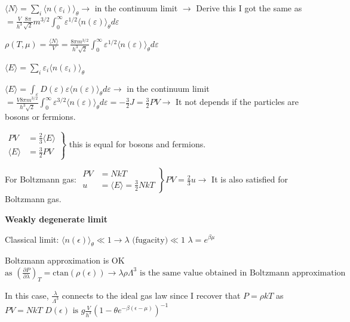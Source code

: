 \documentclass[12pt,a4paper]{report}
\newcommand{\esp}{\vspace{0.5cm}}
\begin{document}
	\esp
	$\langle N \rangle = \sum_i \langle n(\varepsilon_i) \rangle_{\theta} \rightarrow$ in the continuum limit $\rightarrow$ Derive this I got the same as $= \frac{V}{h^3} \frac{8\pi}{\sqrt{2}} m^{3/2} \int_{0}^{\infty} \varepsilon^{1/2} \langle n(\varepsilon) \rangle_{\theta} d\varepsilon$
	
	\esp
	$\rho(T, \mu) = \frac{\langle N \rangle}{V} = \frac{8\pi m^{3/2}}{h^3 \sqrt{2}} \int_{0}^{\infty} \varepsilon^{1/2} \langle n(\varepsilon) \rangle_{\theta} d\varepsilon$
	
	\esp
	$\langle E \rangle = \sum_i \varepsilon_i \langle n(\varepsilon_i) \rangle_{\theta}$
	
	\esp
	$\langle E \rangle = \int_{\varepsilon} D(\varepsilon) \varepsilon \langle n(\varepsilon) \rangle_{\theta} d\varepsilon \rightarrow$ in the continuum limit $= \frac{V 8\pi m^{3/2}}{h^3 \sqrt{2}} \int_{0}^{\infty} \varepsilon^{3/2} \langle n(\varepsilon) \rangle_{\theta} d\varepsilon = -\frac{3}{2} J = \frac{3}{2} PV \rightarrow$ It not depends if the particles are bosons or fermions.
	
	\esp
	$\left. \begin{aligned} PV &= \frac{2}{3} \langle E \rangle \\ \langle E \rangle &= \frac{3}{2} PV \end{aligned} \right\}$ this is equal for bosons and fermions.
	
	\esp
	For Boltzmann gas:
	$\left. \begin{aligned} PV &= NkT \\ u &= \langle E \rangle = \frac{3}{2} NkT \end{aligned} \right\} PV = \frac{2}{3} u \rightarrow$ It is also satisfied for Boltzmann gas.
	
	\esp
	
	\textbf{Weakly degenerate limit}
	
	\esp
	Classical limit:
	$\langle n(\epsilon) \rangle_{\theta} \ll 1 \rightarrow \lambda \text{ (fugacity)} \ll 1$
	$\lambda = e^{\beta\mu}$
	
	\esp
	Boltzmann approximation is OK
	$\text{as } (\frac{\partial P}{\partial \lambda})_T = \text{ctan}(\rho(\epsilon)) \rightarrow \lambda \rho \Lambda^3 \text{ is the same value obtained in Boltzmann approximation}$
	
	\esp
	In this case, $\frac{\lambda}{\Lambda^3}$ connects to the ideal gas law since I recover that $P = \rho kT$ as $PV = NkT$
	$D(\epsilon) \text{ is } g \frac{V}{h^3} (1 - \theta e^{-\beta(\epsilon-\mu)})^{-1}$
	
\end{document}
